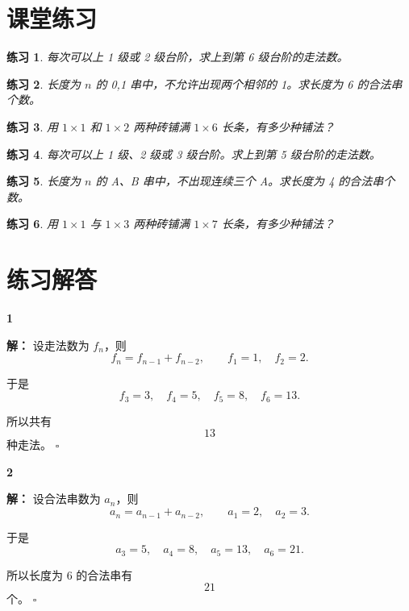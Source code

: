\documentclass[11pt,a4paper,fontset=fandol]{ctexart}
\theoremstyle{formaltheorem}
\theoremstyle{formalexample}
\newtheorem{exercise}{练习}[section]
\newenvironment{solution}{\par\noindent\textbf{解：}}{\hfill$\square$\par}
\begin{document}
\section{课堂练习}

\begin{exercise}
每次可以上 1 级或 2 级台阶，求上到第 6 级台阶的走法数。
\end{exercise}

\begin{exercise}
长度为 $n$ 的 0,1 串中，不允许出现两个相邻的 1。求长度为 6 的合法串个数。
\end{exercise}

\begin{exercise}
用 $1\times 1$ 和 $1\times 2$ 两种砖铺满 $1\times 6$ 长条，有多少种铺法？
\end{exercise}

\begin{exercise}
每次可以上 1 级、2 级或 3 级台阶。求上到第 5 级台阶的走法数。
\end{exercise}

\begin{exercise}
长度为 $n$ 的 A、B 串中，不出现连续三个 A。求长度为 4 的合法串个数。
\end{exercise}

\begin{exercise}
用 $1\times 1$ 与 $1\times 3$ 两种砖铺满 $1\times 7$ 长条，有多少种铺法？
\end{exercise}

\newpage
\appendix
\section{练习解答}

\textbf{1}\begin{solution}
设走法数为 $f_n$，则
\[
  f_n=f_{n-1}+f_{n-2},
  \qquad
  f_1=1,
  \quad
  f_2=2.
\]

于是
\[
  f_3=3,
  \quad
  f_4=5,
  \quad
  f_5=8,
  \quad
  f_6=13.
\]

所以共有
\[
  13
\]
种走法。
\end{solution}

\textbf{2}\begin{solution}
设合法串数为 $a_n$，则
\[
  a_n=a_{n-1}+a_{n-2},
  \qquad
  a_1=2,
  \quad
  a_2=3.
\]

于是
\[
  a_3=5,
  \quad
  a_4=8,
  \quad
  a_5=13,
  \quad
  a_6=21.
\]

所以长度为 6 的合法串有
\[
  21
\]
个。
\end{solution}
\end{document}
